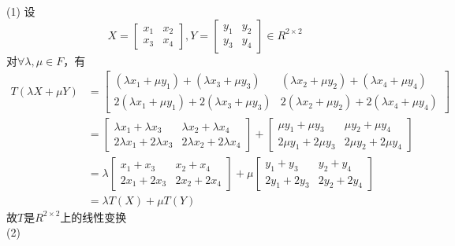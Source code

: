 \documentclass{article}
\begin{document}
\section{}
(1)
设
\begin{equation}
	X=\begin{bmatrix} x_1 & x_2\\x_3 & x_4\end{bmatrix},Y=\begin{bmatrix} y_1 & y_2\\y_3 &y_4\end{bmatrix}\in R^{2\times 2}
\end{equation}
对$ \forall \lambda,\mu \in F $，有
\begin{equation}
	\begin{aligned}
	T(\lambda X+\mu Y)&=\begin{bmatrix} (\lambda x_1+\mu y_1)+(\lambda x_3+\mu y_3)&  (\lambda x_2+\mu y_2)+(\lambda x_4+\mu y_4)\\2(\lambda x_1+\mu y_1)+2(\lambda x_3+\mu y_3) &2(\lambda x_2+\mu y_2)+2(\lambda x_4+\mu y_4)\end{bmatrix}\\
	&=\begin{bmatrix} \lambda x_1+\lambda x_3&  \lambda x_2+\lambda x_4\\2\lambda x_1+2\lambda x_3 &2\lambda x_2+2\lambda x_4\end{bmatrix}+\begin{bmatrix} \mu y_1+\mu y_3&  \mu y_2+\mu y_4\\2\mu y_1+2\mu y_3 &2\mu y_2+2\mu y_4\end{bmatrix}\\
	&=\lambda\begin{bmatrix} x_1+ x_3&   x_2+ x_4\\2 x_1+2 x_3 &2 x_2+2x_4\end{bmatrix}+\mu\begin{bmatrix}  y_1+ y_3&   y_2+ y_4\\2 y_1+2 y_3 &2 y_2+2 y_4\end{bmatrix}\\
	&=\lambda T(X)+\mu T(Y)
	\end{aligned}
\end{equation}
故$ T $是$  R^{2\times 2}$上的线性变换\\
(2)
\end{document}
